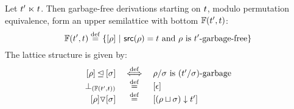 \begin{proposition}
Let $t' \mathrel{\ltimes} t$.
Then garbage-free derivations starting on $t$, modulo permutation equivalence,
form an upper semilattice with bottom $\mathbb{F}(t', t)$:
\[
  \mathbb{F}(t', t) \overset{\mathrm{def}}{=} \{{[\rho]} \ |\  \mathsf{src}(\rho) = t \text{ and } \rho \text{ is $t'$-garbage-free}\}
\]
The lattice structure is given by:
\[
  \begin{array}{rcl}
    {[\rho]} \unlhd {[\sigma]} & \overset{\mathrm{def}}{\iff} & \rho/\sigma \text{ is $(t'/\sigma)$-garbage} \\
    \bot_{(\mathbb{F}(t', t))}         & \overset{\mathrm{def}}{=}  & {[\epsilon]} \\
    {[\rho]} \triangledown {[\sigma]}  & \overset{\mathrm{def}}{=}  & {[(\rho \sqcup \sigma) \downarrow t']} \\
  \end{array}
\]
\end{proposition}
